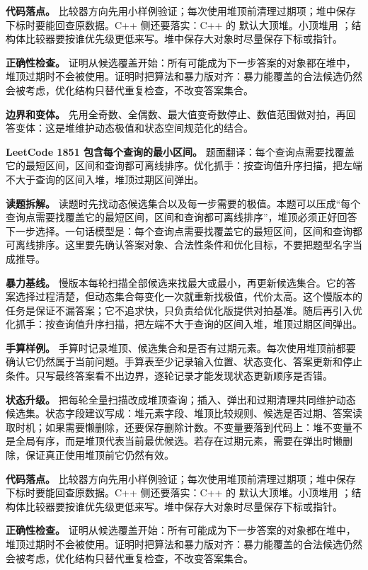 \textbf{代码落点。} 比较器方向先用小样例验证；每次使用堆顶前清理过期项；堆中保存下标时要能回查原数据。C++ 侧还要落实：C++ 的  默认大顶堆。小顶堆用 ；结构体比较器要按谁优先级更低来写。堆中保存大对象时尽量保存下标或指针。

\textbf{正确性检查。} 证明从候选覆盖开始：所有可能成为下一步答案的对象都在堆中，堆顶过期时不会被使用。证明时把算法和暴力版对齐：暴力能覆盖的合法候选仍然会被考虑，优化结构只替代重复检查，不改变答案集合。

\textbf{边界和变体。} 先用全奇数、全偶数、最大值变奇数停止、数值范围做对拍，再回答变体：这是堆维护动态极值和状态空间规范化的结合。

\noindent\textbf{LeetCode 1851 包含每个查询的最小区间。} 题面翻译：每个查询点需要找覆盖它的最短区间，区间和查询都可离线排序。优化抓手：按查询值升序扫描，把左端不大于查询的区间入堆，堆顶过期区间弹出。

\textbf{读题拆解。} 读题时先找动态候选集合以及每一步需要的极值。本题可以压成“每个查询点需要找覆盖它的最短区间，区间和查询都可离线排序”，堆顶必须正好回答下一步选择。一句话模型是：每个查询点需要找覆盖它的最短区间，区间和查询都可离线排序。这里要先确认答案对象、合法性条件和优化目标，不要把题型名字当成推导。

\textbf{暴力基线。} 慢版本每轮扫描全部候选来找最大或最小，再更新候选集合。它的答案选择过程清楚，但动态集合每变化一次就重新找极值，代价太高。这个慢版本的任务是保证不漏答案；它不追求快，只负责给优化版提供对拍基准。随后再引入优化抓手：按查询值升序扫描，把左端不大于查询的区间入堆，堆顶过期区间弹出。

\textbf{手算样例。} 手算时记录堆顶、候选集合和是否有过期元素。每次使用堆顶前都要确认它仍然属于当前问题。手算表至少记录输入位置、状态变化、答案更新和停止条件。只写最终答案看不出边界，逐轮记录才能发现状态更新顺序是否错。

\textbf{状态升级。} 把每轮全量扫描改成堆顶查询；插入、弹出和过期清理共同维护动态候选集。状态字段建议写成：堆元素字段、堆顶比较规则、候选是否过期、答案读取时机；如果需要懒删除，还要保存删除计数。不变量要落到代码上：堆不变量不是全局有序，而是堆顶代表当前最优候选。若存在过期元素，需要在弹出时懒删除，保证真正使用堆顶前它仍然有效。

\textbf{代码落点。} 比较器方向先用小样例验证；每次使用堆顶前清理过期项；堆中保存下标时要能回查原数据。C++ 侧还要落实：C++ 的  默认大顶堆。小顶堆用 ；结构体比较器要按谁优先级更低来写。堆中保存大对象时尽量保存下标或指针。

\textbf{正确性检查。} 证明从候选覆盖开始：所有可能成为下一步答案的对象都在堆中，堆顶过期时不会被使用。证明时把算法和暴力版对齐：暴力能覆盖的合法候选仍然会被考虑，优化结构只替代重复检查，不改变答案集合。

